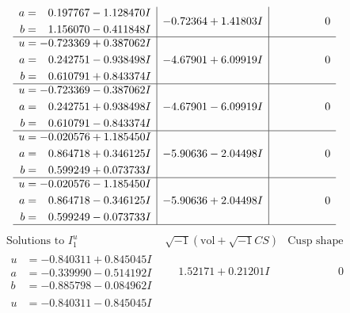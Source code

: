 \documentclass[1p]{elsarticle_modified}
\theoremstyle{definition}
\newcommand{\I}{\sqrt{-1}}
\begin{document}
$$\begin{array}{c|c|c}
\begin{aligned}
a &= \phantom{-}0.197767 - 1.128470 I \\
b &= \phantom{-}1.156070 - 0.411848 I\end{aligned}
 & -0.72364 + 1.41803 I & \phantom{-0.000000 } 0 \\ \hline\begin{aligned}
u &= -0.723369 + 0.387062 I \\
a &= \phantom{-}0.242751 - 0.938498 I \\
b &= \phantom{-}0.610791 + 0.843374 I\end{aligned}
 & -4.67901 + 6.09919 I & \phantom{-0.000000 } 0 \\ \hline\begin{aligned}
u &= -0.723369 - 0.387062 I \\
a &= \phantom{-}0.242751 + 0.938498 I \\
b &= \phantom{-}0.610791 - 0.843374 I\end{aligned}
 & -4.67901 - 6.09919 I & \phantom{-0.000000 } 0 \\ \hline\begin{aligned}
u &= -0.020576 + 1.185450 I \\
a &= \phantom{-}0.864718 + 0.346125 I \\
b &= \phantom{-}0.599249 + 0.073733 I\end{aligned}
 & -5.90636 - 2.04498 I & \phantom{-0.000000 } 0 \\ \hline\begin{aligned}
u &= -0.020576 - 1.185450 I \\
a &= \phantom{-}0.864718 - 0.346125 I \\
b &= \phantom{-}0.599249 - 0.073733 I\end{aligned}
 & -5.90636 + 2.04498 I & \phantom{-0.000000 } 0\\
 \hline 
 \end{array}$$\newpage$$\begin{array}{c|c|c}  
\text{Solutions to }I^u_{1}& \I (\text{vol} + \sqrt{-1}CS) & \text{Cusp shape}\\
 \hline 
\begin{aligned}
u &= -0.840311 + 0.845045 I \\
a &= -0.339990 - 0.514192 I \\
b &= -0.885798 - 0.084962 I\end{aligned}
 & \phantom{-}1.52171 + 0.21201 I & \phantom{-0.000000 } 0 \\ \hline\begin{aligned}
u &= -0.840311 - 0.845045 I \\

\end{aligned}
\end{array}$$
\end{document}
